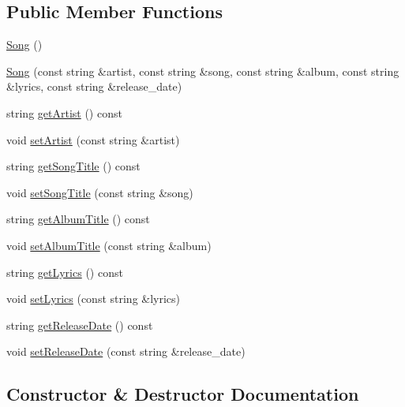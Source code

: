 \subsection*{Public Member Functions}
\begin{DoxyCompactItemize}
\item 
\hyperlink{classbridges_1_1dataset_1_1_song_a6b7523787312a5b8d16b20b09ab59ea6}{Song} ()
\item 
\hyperlink{classbridges_1_1dataset_1_1_song_a0938ada0b5596c874aa9254f1bde1275}{Song} (const string \&artist, const string \&song, const string \&album, const string \&lyrics, const string \&release\+\_\+date)
\item 
string \hyperlink{classbridges_1_1dataset_1_1_song_a1d0ccb86300534ad221a36171e7b2e2b}{get\+Artist} () const
\item 
void \hyperlink{classbridges_1_1dataset_1_1_song_ab37a93674d0e4b219d24c14cfc2b0756}{set\+Artist} (const string \&artist)
\item 
string \hyperlink{classbridges_1_1dataset_1_1_song_a78d4dd02799751849d54b66208cc52a8}{get\+Song\+Title} () const
\item 
void \hyperlink{classbridges_1_1dataset_1_1_song_aa707a5a8905585643893b6c71bf5e299}{set\+Song\+Title} (const string \&song)
\item 
string \hyperlink{classbridges_1_1dataset_1_1_song_a0bc005c3522a1ac6c36bbf721014cb07}{get\+Album\+Title} () const
\item 
void \hyperlink{classbridges_1_1dataset_1_1_song_aab02dcdc8f5332ff18e5127210ba17dc}{set\+Album\+Title} (const string \&album)
\item 
string \hyperlink{classbridges_1_1dataset_1_1_song_a422252665dfb6eff87bef86726c5bc74}{get\+Lyrics} () const
\item 
void \hyperlink{classbridges_1_1dataset_1_1_song_a1ec794f19e791366b9af9df132d4a4b5}{set\+Lyrics} (const string \&lyrics)
\item 
string \hyperlink{classbridges_1_1dataset_1_1_song_aa4ffed01f8c77803e382ba2264fc91ee}{get\+Release\+Date} () const
\item 
void \hyperlink{classbridges_1_1dataset_1_1_song_ab40e43ae94ffc57d2f036769d807a144}{set\+Release\+Date} (const string \&release\+\_\+date)
\end{DoxyCompactItemize}


\subsection{Constructor \& Destructor Documentation}
\mbox{\label{classbridges_1_1dataset_1_1_song_a6b7523787312a5b8d16b20b09ab59ea6}} 
